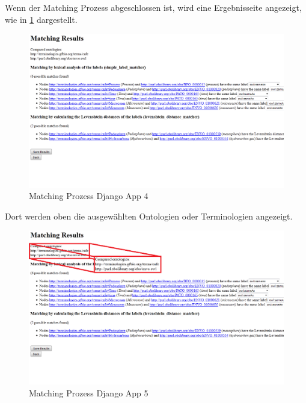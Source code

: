 		\pagebreak[4]
		Wenn der Matching Prozess abgeschlossen ist, wird eine Ergebnisseite
		angezeigt, wie in \ref{fig7} dargestellt.
		\begin{figure}[h!]
		\centering
		\includegraphics[width=1.0\textwidth]{pics/SimpleOntologyMatcher-Process3.png}
		\caption{Matching Prozess Django App 4}
		\label{fig7}
		\end{figure}
		
		\pagebreak[4]
		Dort werden oben die ausgewählten Ontologien oder Terminologien angezeigt.
		\begin{figure}[h!]
		\centering
		\includegraphics[width=1.0\textwidth]{pics/SimpleOntologyMatcher-Process4.png}
		\caption{Matching Prozess Django App 5}
		\label{fig8}
		\end{figure}
		
